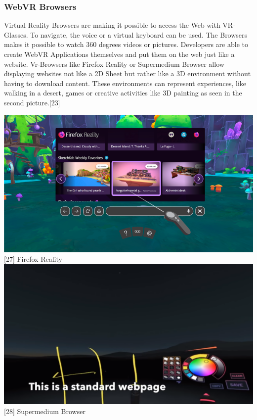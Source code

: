 \documentclass[runningheads]{llncs}
\begin{document}
			\subsubsection{WebVR Browsers}
				\leavevmode\newline
				Virtual Reality Browsers are making it possible to access the Web with VR-Glasses. To navigate, the voice or a virtual keyboard can be used. The Browsers makes it possible to watch 360 degrees videos or pictures. Developers are able to create WebVR Applications themselves and put them on the web just like a website. Vr-Browsers like Firefox Reality or Supermedium Browser allow displaying websites not like a 2D Sheet but rather like a 3D environment without having to download content. These environments can represent experiences, like walking in a desert, games or creative activities like 3D painting as seen in the second picture.[23]
			\begin{center}
				\includegraphics[scale=0.35]{Firefox_Reality.png}
				[27]	Firefox Reality
				\includegraphics[scale=0.35]{Supermedium.png}
				[28] Supermedium Browser
			\end{center}
\end{document}
